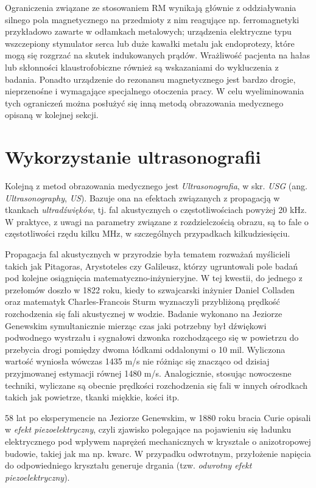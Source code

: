 Ograniczenia związane ze stosowaniem RM wynikają głównie z oddziaływania silnego pola magnetycznego na przedmioty z nim reagujące np. ferromagnetyki przykładowo zawarte w odłamkach metalowych; urządzenia elektryczne typu wszczepiony stymulator serca lub duże kawałki metalu jak endoprotezy, które mogą się rozgrzać na skutek indukowanych prądów. Wrażliwość pacjenta na hałas lub skłonności klaustrofobiczne również są wskazaniami do wykluczenia z badania. Ponadto urządzenie do rezonansu magnetycznego jest bardzo drogie, nieprzenośne i wymagające specjalnego otoczenia pracy. W celu wyeliminowania tych ograniczeń można posłużyć się inną metodą obrazowania medycznego opisaną w kolejnej sekcji. 

\section{Wykorzystanie ultrasonografii}
\label{USG}

Kolejną z metod obrazowania medycznego jest \textit{Ultrasonografia}, w skr. \textit{USG} (ang. \textit{Ultrasonography}, \textit{US}). Bazuje ona na efektach związanych z propagacją w tkankach \textit{ultradźwięków}, tj. fal akustycznych o częstotliwościach powyżej 20 kHz. W praktyce, z uwagi na parametry związane z rozdzielczością obrazu, są to fale o częstotliwości rzędu kilku MHz, w szczególnych przypadkach kilkudziesięciu.

Propagacja fal akustycznych w przyrodzie była tematem rozważań myślicieli takich jak Pitagoras, Arystoteles czy Galileusz, którzy ugruntowali pole badań pod kolejne osiągnięcia matematyczno-inżynieryjne. W tej kwestii, do jednego z przełomów doszło w 1822 roku, kiedy to szwajcarski inżynier Daniel Colladen oraz matematyk Charles-Francois Sturm wyznaczyli przybliżoną prędkość rozchodzenia się fali akustycznej w wodzie. Badanie wykonano na Jeziorze Genewskim symultanicznie mierząc czas jaki potrzebny był dźwiękowi podwodnego wystrzału i sygnałowi dzwonka rozchodzącego się w powietrzu do przebycia drogi pomiędzy dwoma łódkami oddalonymi o 10 mil. Wyliczona wartość wyniosła wówczas 1435 m/s nie różniąc się znacząco od dzisiaj przyjmowanej estymacji równej 1480 m/s. Analogicznie, stosując nowoczesne techniki, wyliczane są obecnie prędkości rozchodzenia się fali w innych ośrodkach takich jak powietrze, tkanki miękkie, kości itp.

58 lat po eksperymencie na Jeziorze Genewskim, w 1880 roku bracia Curie opisali w \cite{Curie1880} \textit{efekt piezoelektryczny}, czyli zjawisko polegające na pojawieniu się ładunku elektrycznego pod wpływem naprężeń mechanicznych w krysztale o anizotropowej budowie, takiej jak ma np. kwarc. W przypadku odwrotnym, przyłożenie napięcia do odpowiedniego kryształu generuje drgania (tzw. \textit{odwrotny efekt piezoelektryczny}). 

